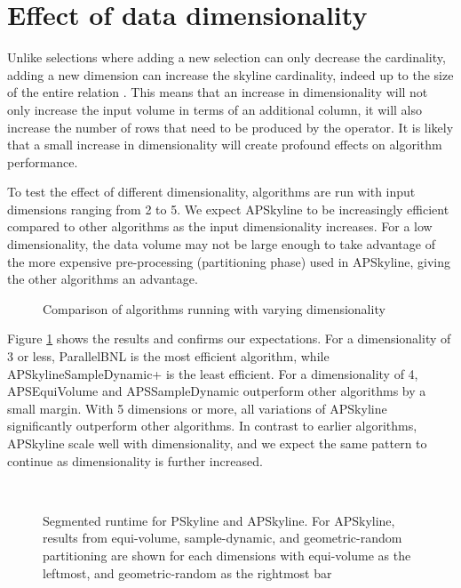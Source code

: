 \documentclass[12pt,a4paper,twoside]{report}
\begin{document}
\section{Effect of data dimensionality}
\label{sec:test4}

Unlike selections where adding a new selection can only decrease the
cardinality, adding a new dimension can increase the skyline
cardinality, indeed up to the size of the entire relation
\cite{chaudhuri2006robust}. This means that an increase in
dimensionality will not only increase the input volume in terms of an
additional column, it will also increase the number of rows that need
to be produced by the operator. It is likely that a small increase in
dimensionality will create profound effects on algorithm performance.

To test the effect of different dimensionality, algorithms are run
with input dimensions ranging from 2 to 5. We expect APSkyline to be
increasingly efficient compared to other algorithms as the input
dimensionality increases. For a low dimensionality, the data volume
may not be large enough to take advantage of the more expensive
pre-processing (partitioning phase) used in APSkyline, giving the
other algorithms an advantage. 

\begin{figure}[H]
	\centering
	\caption{Comparison of algorithms running with varying dimensionality}
	\label{fig:test-dimensionality}
\end{figure}

Figure \ref{fig:test-dimensionality} shows the results and confirms
our expectations. For a dimensionality of 3 or less, ParallelBNL is
the most efficient algorithm, while APSkylineSampleDynamic+ is the
least efficient. For a dimensionality of 4, APSEquiVolume and
APSSampleDynamic outperform other algorithms by a small margin. With 5
dimensions or more, all variations of APSkyline significantly
outperform other algorithms. In contrast to earlier algorithms,
APSkyline scale well with dimensionality, and we expect the same
pattern to continue as dimensionality is further increased.

\begin{figure}[H]
	\centering
		\\
	\caption{Segmented runtime for PSkyline and APSkyline. For
	APSkyline, results from equi-volume, sample-dynamic, and
	geometric-random partitioning are shown for each dimensions
	with equi-volume as the leftmost, and geometric-random as
	the rightmost bar}
	\label{fig:test-dimensionality-segmented}
\end{figure}
\end{document}
